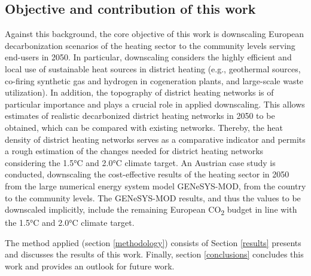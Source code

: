 \subsection{Objective and contribution of this work}
Against this background, the core objective of this work is downscaling European decarbonization scenarios of the heating sector to the community levels serving end-users in 2050. In particular, downscaling considers the highly efficient and local use of sustainable heat sources in district heating (e.g., geothermal sources, co-firing synthetic gas and hydrogen in cogeneration plants, and large-scale waste utilization). In addition, the topography of district heating networks is of particular importance and plays a crucial role in applied downscaling. This allows estimates of realistic  decarbonized district heating networks in 2050 to be obtained, which can be compared with existing networks. Thereby, the heat density of district heating networks serves as a comparative indicator and permits a rough estimation of the changes needed for district heating networks considering the 1.5°C and 2.0°C climate target. An Austrian case study is conducted, downscaling the cost-effective results of the heating sector in 2050 from the large numerical energy system model GENeSYS-MOD, from the country to the community levels.  The GENeSYS-MOD results, and thus the values to be downscaled implicitly, include the remaining European CO\textsubscript{2} budget in line with the 1.5°C and 2.0°C climate target.\vspace{0.3cm}

The method applied (section \ref{methodology}) consists of  Section \ref{results} presents and discusses the results of this work.  Finally, section \ref{conclusions} concludes this work and provides an outlook for future work.